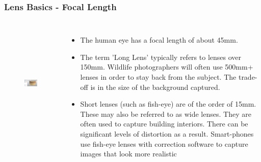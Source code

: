 \begin{frame}
\frametitle{Lens Basics - Focal Length}
       \begin{columns}
             \centering
						
						\begin{figure}
							\centering
								\includegraphics[height=5cm, width=3.5cm]{img/AddingEdges.JPG}
							\label{fig:AddingEdges}
						\end{figure}
						
						\begin{itemize}
							\item The human eye has a focal length of about 45mm.  
							\item The term 'Long Lens' typically refers to lenses over 150mm.  Wildlife photographers will often use 500mm+ lenses in order to stay back from the subject.  The trade-off is in the size of the background captured.
							\item Short lenses (such as fish-eye) are of the order of 15mm.  These may also be referred to as wide lenses.   They are often used to capture building interiors.  There can be significant levels of distortion as a result.  Smart-phones use fish-eye lenses with correction software to capture images that look more realistic
						\end{itemize}
         \end{columns} 
\end{frame}


